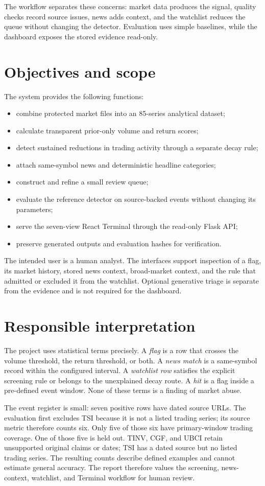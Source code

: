 The workflow separates these concerns: market data produces the signal,
quality checks record source issues, news adds context, and the watchlist
reduces the queue without changing the detector. Evaluation uses simple
baselines, while the dashboard exposes the stored evidence read-only.

\section{Objectives and scope}

The system provides the following functions:
\begin{itemize}
  \setlength{\itemsep}{0pt}
  \setlength{\parskip}{0pt}
  \item combine protected market files into an 85-series
  analytical dataset;
  \item calculate transparent prior-only volume and return scores;
  \item detect sustained reductions in trading activity through a separate
  decay rule;
  \item attach same-symbol news and deterministic headline categories;
  \item construct and refine a small review queue;
  \item evaluate the reference detector on source-backed events without
  changing its parameters;
  \item serve the seven-view React Terminal through the read-only Flask API;
  \item preserve generated outputs and evaluation hashes for verification.
\end{itemize}

The intended user is a human analyst. The interfaces support inspection of a
flag, its market history, stored news context, broad-market context, and the
rule that admitted or excluded it from the watchlist. Optional generative
triage is separate from the evidence and is not required for the dashboard.

\section{Responsible interpretation}

The project uses statistical terms precisely. A \emph{flag} is a row that
crosses the volume threshold, the return threshold, or both. A \emph{news
match} is a same-symbol record within the configured interval. A
\emph{watchlist row} satisfies the explicit screening rule or belongs to the
unexplained decay route. A \emph{hit} is a flag inside a pre-defined event
window. None of these terms is a finding of market abuse.

The event register is small: seven positive rows have dated source URLs.
The evaluation first excludes TSI because it is not a listed trading series;
its source metric therefore counts six. Only five of those six have
primary-window trading coverage. One of those five is held out. TINV,
CGF, and UBCI retain unsupported original claims or dates; TSI has a dated
source but no listed trading series. The resulting counts describe defined
examples and cannot estimate general accuracy. The report therefore values
the screening, news-context, watchlist, and Terminal workflow for human review.
